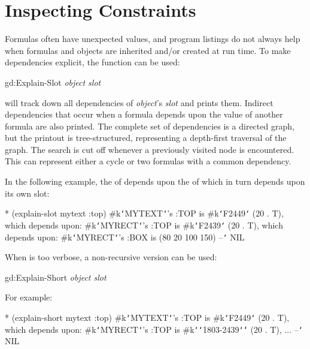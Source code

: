 \chapter{Inspecting Constraints}
Formulas often have unexpected values, and program listings do
not always help when formulas and objects are inherited and/or
created at run time.  To make dependencies 
explicit, the
 function can be used:
\begin{programexample}
gd:Explain-Slot {\it object slot}\value{function}
\end{programexample}
 will track down all dependencies of {\it object}'s
{\it slot} and prints them.  Indirect dependencies that occur when
a formula depends upon the value of another formula are also
printed.  The complete set of dependencies is a directed graph,
but the printout is tree-structured, representing a depth-first
traversal of the graph.  The search is cut off whenever a
previously visited node is encountered.  This can represent
either a cycle or two formulas with a common dependency.

In the following example, the  of  depends
upon the  of  which in turn depends upon its
own  slot:
\begin{programexample}
* (explain-slot mytext :top)
\#k{\tt\char`\<}MYTEXT{\tt\char`\>}'s :TOP is \#k{\tt\char`\<}F2449{\tt\char`\>} (20 . T),
which depends upon:
   \#k{\tt\char`\<}MYRECT{\tt\char`\>}'s :TOP is \#k{\tt\char`\<}F2439{\tt\char`\>} (20 . T),
   which depends upon:
      \#k{\tt\char`\<}MYRECT{\tt\char`\>}'s :BOX is (80 20 100 150)
--{\tt\char`\>} NIL
\end{programexample}

When  is too verbose, a non-recursive version
can be used:
\begin{programexample}
gd:Explain-Short {\it object slot}\value{function}
\end{programexample}
For example:
\begin{programexample}
* (explain-short mytext :top)
\#k{\tt\char`\<}MYTEXT{\tt\char`\>}'s :TOP is \#k{\tt\char`\<}F2449{\tt\char`\>} (20 . T),
which depends upon:
   \#k{\tt\char`\<}MYRECT{\tt\char`\>}'s :TOP is \#k{\tt\char`\<}{\tt\char`\|}1803-2439{\tt\char`\|}{\tt\char`\>} (20 . T),
      ...
--{\tt\char`\>} NIL
\end{programexample}

